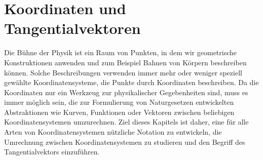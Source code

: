 %
%
%
\chapter{Koordinaten und Tangentialvektoren
\label{chapter:koordinaten}}
Die Bühne der Physik ist ein Raum von Punkten, in dem wir geometrische
Konstruktionen anwenden und zum Beispiel Bahnen von Körpern beschreiben
können.
Solche Beschreibungen verwenden immer mehr oder weniger speziell gewählte
Koordinatensysteme, die Punkte durch Koordinaten beschreiben.
Da die Koordinaten nur ein Werkzeug zur physikalischer Gegebenheiten
sind, muss es immer möglich sein, die zur Formulierung von Naturgesetzen
entwickelten Abstraktionen wie Kurven, Funktionen oder Vektoren zwischen
beliebigen Koordinatensystemen umzurechnen.
Ziel dieses Kapitels ist daher, eine für alle Arten von Koordinatensystemen
nützliche Notation zu entwickeln, die Umrechnung zwischen Koordinatensystemen
zu studieren und den Begriff des Tangentialvektors einzuführen.






\uebungsabschnitt

\begin{uebungsaufgaben}
\end{uebungsaufgaben}
\enduebungsabschnitt

